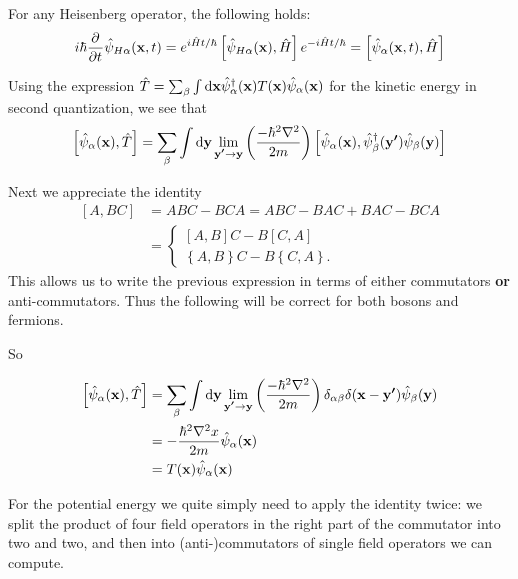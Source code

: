 For any Heisenberg operator, the following holds:
\[i\hbar  \frac{\partial{^{}}}{\partial{{t}^{}}} \hat{\psi}_{H\alpha}(\bm{\mathrm{x}},t) = e^{i\hat{H}t/\hbar} \left[\hat{\psi}_{H\alpha}(\bm{\mathrm{x}}),\hat{H}\right]e^{-i\hat{H}t/\hbar} =  \left[\hat{\psi}_{\alpha}(\bm{\mathrm{x}},t),\hat{H}\right]\]

Using the expression $\hat{T} = \sum_\beta \int \operatorname{d \!}{\bm{\mathrm{x}}} \hat{\psi}^\dagger_\alpha(\bm{\mathrm{x}})T(\bm{\mathrm{x}})\hat{\psi}_\alpha(\bm{\mathrm{x}})$ for the kinetic energy in second quantization, we see that
\begin{align*}
\left[\hat{\psi}_\alpha(\bm{\mathrm{x}}), \hat{T}\right] &= \sum_\beta \int \operatorname{d \!}{\bm{\mathrm{y}}} \lim_{\bm{\mathrm{y'}} \to \bm{\mathrm{y}}}\left(\frac{-\hbar^2\nabla^2}{2m}\right)\left[\hat{\psi}_\alpha(\bm{\mathrm{x}}), \hat{\psi}^\dagger_\beta(\bm{\mathrm{y'}})\hat{\psi}_\beta(\bm{\mathrm{y}})\right] \\
\end{align*}

Next we appreciate the identity
\begin{align*}
\left[A,BC\right] &= ABC - BCA = ABC - BAC + BAC - BCA \\
&= \begin{cases}
\left[A,B\right]C - B \left[C,A\right] \\
\left\{A,B\right\}C - B \left\{C,A\right\}.
\end{cases}
\end{align*}
This allows us to write the previous expression in terms of either commutators \textbf{or} anti-commutators. Thus the following will be correct for both bosons and fermions.

So

\begin{align*}
\left[\hat{\psi}_\alpha(\bm{\mathrm{x}}), \hat{T}\right] &= \sum_\beta \int \operatorname{d \!}{\bm{\mathrm{y}}} \lim_{\bm{\mathrm{y'}} \to \bm{\mathrm{y}}}\left(\frac{-\hbar^2\nabla^2}{2m}\right)\delta_{\alpha\beta}\delta(\bm{\mathrm{x}}- \bm{\mathrm{y'}})\hat{\psi}_\beta(\bm{\mathrm{y}}) \\
&= - \frac{\hbar^2\nabla^2 x}{2m}\hat{\psi}_\alpha(\bm{\mathrm{x}}) \\
&= T(\bm{\mathrm{x}})\hat{\psi}_{\alpha}(\bm{\mathrm{x}})
\end{align*}

For the potential energy we quite simply need to apply the identity twice: we split the product of four field operators in the right part of the commutator into two and two, and then into (anti-)commutators of single field operators we can compute.

